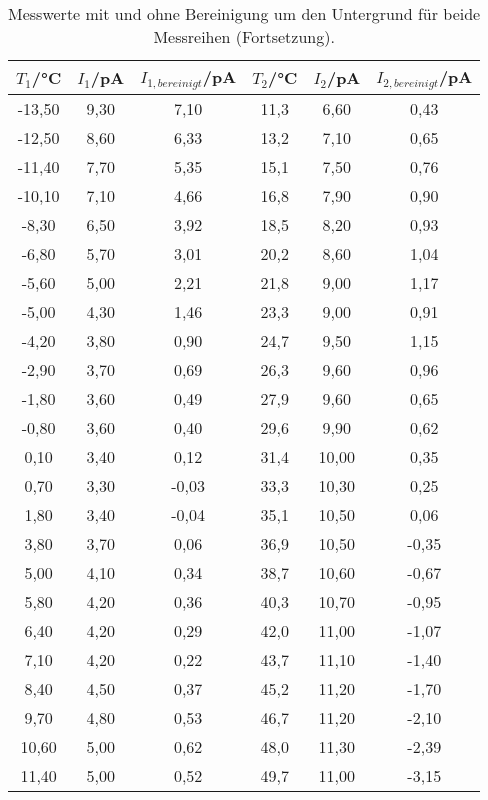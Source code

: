   \begin{table}[htp]
  	\begin{center}
      \caption{Messwerte mit und ohne Bereinigung um den Untergrund für beide Messreihen (Fortsetzung).}
      \label{tab:messwerte2}
  		\begin{tabular}{cccccc}
  		\toprule
  			{$T_1$/°C} & {$I_1$/pA} & {$I_{1,bereinigt}$/pA} & {$T_2$/°C} & {$I_2$/pA} & {$I_{2,bereinigt}$/pA}\\
  			\midrule
			-13,50 & 9,30 & 7,10 & 11,3 & 6,60 & 0,43\\
			-12,50 & 8,60 & 6,33 & 13,2 & 7,10 & 0,65\\
			-11,40 & 7,70 & 5,35 & 15,1 & 7,50 & 0,76\\
			-10,10 & 7,10 & 4,66 & 16,8 & 7,90 & 0,90\\
			-8,30 & 6,50 & 3,92 & 18,5 	& 8,20 & 0,93\\
			-6,80 & 5,70 & 3,01 & 20,2 	& 8,60 & 1,04\\
			-5,60 & 5,00 & 2,21 & 21,8 	& 9,00 & 1,17\\
			-5,00 & 4,30 & 1,46 & 23,3 	& 9,00 & 0,91\\
			-4,20 & 3,80 & 0,90 & 24,7 	& 9,50 & 1,15\\
			-2,90 & 3,70 & 0,69 & 26,3 	& 9,60 & 0,96\\
			-1,80 & 3,60 & 0,49 & 27,9 	& 9,60 & 0,65\\
			-0,80 & 3,60 & 0,40 & 29,6 	& 9,90 & 0,62\\
			0,10  & 3,40 & 0,12 & 31,4 	& 10,00 & 0,35\\
			0,70  & 3,30 & -0,03& 33,3  & 10,30 & 0,25\\
			1,80  & 3,40 & -0,04& 35,1  & 10,50 & 0,06\\
			3,80  & 3,70 & 0,06 & 36,9  & 10,50 & -0,35\\
			5,00  & 4,10 & 0,34 & 38,7  & 10,60 & -0,67\\
			5,80  & 4,20 & 0,36 & 40,3  & 10,70 & -0,95\\
			6,40  & 4,20 & 0,29 & 42,0  & 11,00 & -1,07\\
			7,10  & 4,20 & 0,22 & 43,7  & 11,10 & -1,40\\
			8,40  & 4,50 & 0,37 & 45,2  & 11,20 & -1,70\\
			9,70  & 4,80 & 0,53 & 46,7  & 11,20 & -2,10\\
			10,60 & 5,00 & 0,62 & 48,0 	& 11,30 & -2,39\\
			11,40 & 5,00 & 0,52 & 49,7 	& 11,00 & -3,15\\

\end{tabular}
\end{center}
\end{table}
